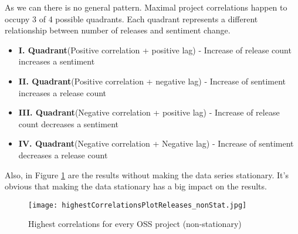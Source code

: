 As we can there is no general pattern. Maximal project correlations happen to occupy 3 of 4 possible quadrants. Each quadrant represents a different relationship between number of releases and sentiment change.

\begin{itemize}
  \item \textbf{I. Quadrant}(Positive correlation + positive lag) - Increase of release count increases a sentiment
  \item \textbf{II. Quadrant}(Positive correlation + negative lag) - Increase of sentiment increases a release count
  \item \textbf{III. Quadrant}(Negative correlation + positive lag) - Increase of release count decreases a sentiment
  \item \textbf{IV. Quadrant}(Negative correlation + Negative lag) - Increase of sentiment decreases a release count
\end{itemize}

Also, in Figure \ref{fig:highestCorrelationsPlotReleases_nonStat} are the results without making the data series stationary. It's obvious that making the data stationary has a big impact on the results.

\begin{figure}[H]%
    \centering
	\texttt{[image: highestCorrelationsPlotReleases\_nonStat.jpg]}
    \caption{Highest correlations for every OSS project (non-stationary)}%
    \label{fig:highestCorrelationsPlotReleases_nonStat}%
\end{figure}